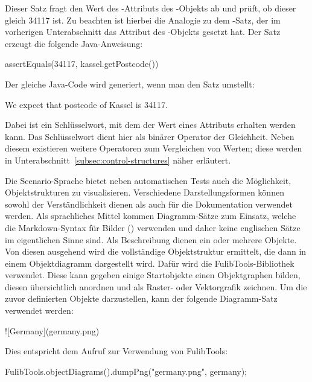 Dieser Satz fragt den Wert des -Attributs des -Objekts ab und prüft, ob dieser gleich 34117 ist.
Zu beachten ist hierbei die Analogie zu dem -Satz, der im vorherigen Unterabschnitt das Attribut des -Objekts gesetzt hat.
Der Satz erzeugt die folgende Java-Anweisung:

\begin{jcodeblock}
    assertEquals(34117, kassel.getPostcode())
\end{jcodeblock}

Der gleiche Java-Code wird generiert, wenn man den Satz umstellt:

\begin{codeblock}
    We expect that postcode of Kassel is 34117.
\end{codeblock}

Dabei ist  ein Schlüsselwort, mit dem der Wert eines Attributs erhalten werden kann.
Das Schlüsselwort  dient hier als binärer Operator der Gleichheit.
Neben diesem existieren weitere Operatoren zum Vergleichen von Werten;
diese werden in Unterabschnitt~\ref{subsec:control-structures} näher erläutert.

Die Scenario-Sprache bietet neben automatischen Tests auch die Möglichkeit, Objektstrukturen zu visualisieren.
Verschiedene Darstellungsformen können sowohl der Verständlichkeit dienen als auch für die Dokumentation verwendet werden.
Als sprachliches Mittel kommen Diagramm-Sätze zum Einsatz, welche die Markdown-Syntax für Bilder () verwenden und daher keine englischen Sätze im eigentlichen Sinne sind.
Als Beschreibung dienen ein oder mehrere Objekte.
Von diesen ausgehend wird die vollständige Objektstruktur ermittelt, die dann in einem Objektdiagramm dargestellt wird.
Dafür wird die FulibTools\cite{fulibTools}-Bibliothek verwendet.
Diese kann gegeben einige Startobjekte einen Objektgraphen bilden, diesen übersichtlich anordnen und als Raster- oder Vektorgrafik zeichnen.
Um die zuvor definierten Objekte darzustellen, kann der folgende Diagramm-Satz verwendet werden:

\begin{mdcodeblock}
    ![Germany](germany.png)
\end{mdcodeblock}

Dies entspricht dem Aufruf zur Verwendung von FulibTools:

\begin{jcodeblock}
    FulibTools.objectDiagrams().dumpPng("germany.png", germany);
\end{jcodeblock}


